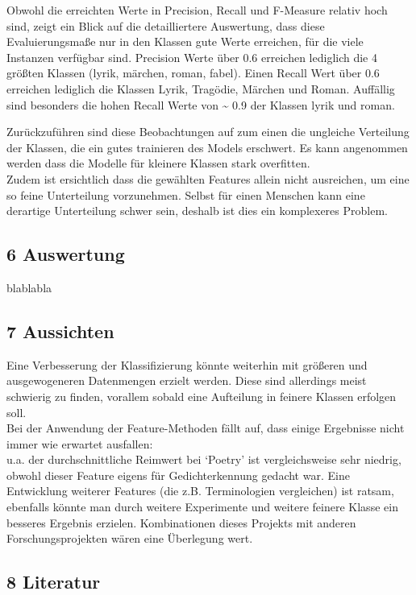 \documentclass[]{article}
\begin{document}
Obwohl die erreichten Werte in Precision, Recall und F-Measure relativ
hoch sind, zeigt ein Blick auf die detailliertere Auswertung, dass diese
Evaluierungsmaße nur in den Klassen gute Werte erreichen, für die viele
Instanzen verfügbar sind. Precision Werte über 0.6 erreichen lediglich
die 4 größten Klassen (lyrik, märchen, roman, fabel). Einen Recall Wert
über 0.6 erreichen lediglich die Klassen Lyrik, Tragödie, Märchen und
Roman. Auffällig sind besonders die hohen Recall Werte von
\textasciitilde{} 0.9 der Klassen lyrik und roman.

Zurückzuführen sind diese Beobachtungen auf zum einen die ungleiche
Verteilung der Klassen, die ein gutes trainieren des Models erschwert.
Es kann angenommen werden dass die Modelle für kleinere Klassen stark
overfitten.\\
Zudem ist ersichtlich dass die gewählten Features allein nicht
ausreichen, um eine so feine Unterteilung vorzunehmen. Selbst für einen
Menschen kann eine derartige Unterteilung schwer sein, deshalb ist dies
ein komplexeres Problem.

\subsection{6 Auswertung}\label{auswertung}

blablabla

\subsection{7 Aussichten}\label{aussichten}

Eine Verbesserung der Klassifizierung könnte weiterhin mit größeren und
ausgewogeneren Datenmengen erzielt werden. Diese sind allerdings meist
schwierig zu finden, vorallem sobald eine Aufteilung in feinere Klassen
erfolgen soll.\\
Bei der Anwendung der Feature-Methoden fällt auf, dass einige Ergebnisse
nicht immer wie erwartet ausfallen:\\
u.a. der durchschnittliche Reimwert bei `Poetry' ist vergleichsweise
sehr niedrig, obwohl dieser Feature eigens für Gedichterkennung gedacht
war. Eine Entwicklung weiterer Features (die z.B. Terminologien
vergleichen) ist ratsam, ebenfalls könnte man durch weitere Experimente
und weitere feinere Klasse ein besseres Ergebnis erzielen. Kombinationen
dieses Projekts mit anderen Forschungsprojekten wären eine Überlegung
wert.

\subsection{8 Literatur}\label{literatur}
\end{document}
